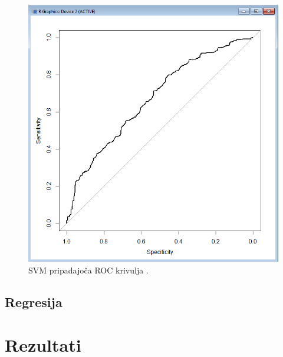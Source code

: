 \documentclass[a4paper,11pt]{article}
\begin{document}
\begin{figure}[H]
\begin{center}
\includegraphics[scale=0.5]{9_SVM_roc.png}
\caption{SVM pripadajoča ROC krivulja .}
\label{slika4}
\end{center}
\end{figure} 


\subsection{Regresija}



\section{Rezultati}
\end{document}
